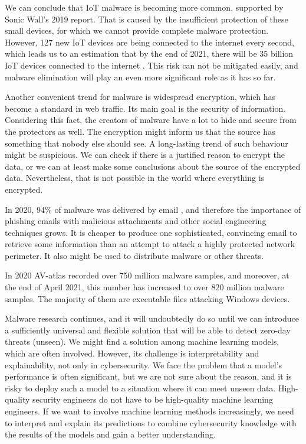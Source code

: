 We can conclude that IoT malware is becoming more common, supported by Sonic Wall's 2019 report. That is caused by the insufficient protection of these small devices, for which we cannot provide complete malware protection. However, 127 new IoT devices are being connected to the internet every second, which leads us to an estimation that by the end of 2021, there will be 35 billion IoT devices connected to the internet \cite{TheIoTRu52:online}. This risk can not be mitigated easily, and malware elimination will play an even more significant role as it has so far.

Another convenient trend for malware is widespread encryption, which has become a standard in web traffic. Its main goal is the security of information. Considering this fact, the creators of malware have a lot to hide and secure from the protectors as well. The encryption might inform us that the source has something that nobody else should see. A long-lasting trend of such behaviour might be suspicious. We can check if there is a justified reason to encrypt the data, or we can at least make some conclusions about the source of the encrypted data. Nevertheless, that is not possible in the world where everything is encrypted.

In 2020, 94\% of malware was delivered by email \cite{Topcyber13:online}, and therefore the importance of phishing emails with malicious attachments and other social engineering techniques grows. It is cheaper to produce one sophisticated, convincing email to retrieve some information than an attempt to attack a highly protected network perimeter. It also might be used to distribute malware or other threats.

In 2020 AV-atlas \cite{AVATLASM39:online} recorded over 750 million malware samples, and moreover, at the end of April 2021, this number has increased to over 820 million malware samples. The majority of them are executable files attacking Windows devices.

Malware research continues, and it will undoubtedly do so until we can introduce a sufficiently universal and flexible solution that will be able to detect zero-day threats (unseen). We might find a solution among machine learning models, which are often involved. However, its challenge is interpretability and explainability, not only in cybersecurity. We face the problem that a model's performance is often significant, but we are not sure about the reason, and it is risky to deploy such a model to a situation where it can meet unseen data. High-quality security engineers do not have to be high-quality machine learning engineers. If we want to involve machine learning methods increasingly, we need to interpret and explain its predictions to combine cybersecurity knowledge with the results of the models and gain a better understanding. 


